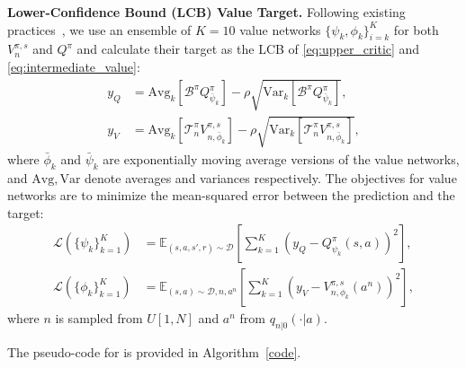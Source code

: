 \textbf{Lower-Confidence Bound (LCB) Value Target. }Following existing practices~\citep{dpqe,dac}, we use an ensemble of $K=10$ value networks $\{\psi_k, \phi_k\}_{i=k}^{K}$ for both $V^{\pi,s}_{n}$ and $Q^\pi$ and calculate their target as the LCB of \eqref{eq:upper_critic} and \eqref{eq:intermediate_value}:
\begin{equation}
\begin{aligned}
    y_Q&=\mathrm{Avg}_k[\mathcal{B}^\pi Q^\pi_{\bar{\psi}_k}]-\rho \sqrt{\mathrm{Var}_k[\mathcal{B}^\pi Q^\pi_{\bar{\psi}_k}]},\\
    y_V&=\mathrm{Avg}_k[\mathcal{T}_n^\pi V^{\pi,s}_{n,\bar{\phi}_k}]-\rho \sqrt{\mathrm{Var}_k[\mathcal{T}_n^\pi V^{\pi,s}_{n,\bar{\phi}_k}]},
\end{aligned}
\end{equation}
where $\bar{\phi}_k$ and $\bar{\psi}_k$ are exponentially moving average versions of the value networks, and $\mathrm{Avg},\mathrm{Var}$ denote averages and variances respectively. The objectives for value networks are to minimize the mean-squared error between the prediction and the target:
\begin{equation}\label{eq:critic_loss}
    \begin{aligned}
        \mathcal{L}(\{\psi_k\}_{k=1}^{K})&=\mathbb{E}_{(s, a, s',r)\sim\mathcal{D}}\left[\sum_{k=1}^K(y_Q - Q^\pi_{\psi_k}(s, a))^2\right],\\
        \mathcal{L}(\{\phi_k\}_{k=1}^{K})&=\mathbb{E}_{(s, a)\sim\mathcal{D}, n,a^n}\left[\sum_{k=1}^K(y_V - V^{\pi,s}_{n,\phi_k}(a^n))^2\right],
    \end{aligned}
\end{equation}
where $n$ is sampled from $U[1, N]$ and $a^n$ from $q_{n|0}(\cdot|a)$. 

The pseudo-code for \algbb is provided in Algorithm~\ref{code}.
